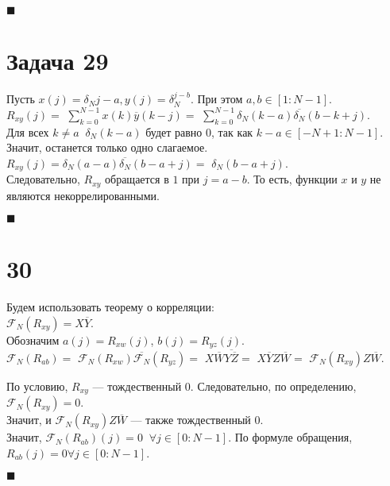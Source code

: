 \documentclass{article}
\newcommand\proofend{\begin{flushright}$\blacksquare$\end{flushright}}
\begin{document}
{\proofend
\pagebreak
\section*{Задача 29}

Пусть $x(j) = \delta_N{j - a}, y(j) = \delta_N^{j - b}$. При этом $a, b \in [1 : N - 1]$.\\

$R_{xy}(j) = $
$\sum\limits_{k = 0}^{N - 1} x(k) \overline{y} (k - j) =$
$\sum\limits_{k = 0}^{N - 1} \delta_N(k - a) \overline{\delta_N} (b - k + j).$\\

Для всех $k \neq a\;\;\delta_N(k - a)$ будет равно $0$, так как $k - a \in [-N+1:N-1]$. Значит, останется только одно слагаемое.\\

$R_{xy}(j) = \delta_N(a - a) \overline{\delta_N} (b - a + j) = $
$\delta_N (b - a + j).$\\
Следовательно, $R_{xy}$ обращается в $1$ при $j = a - b$. То есть, функции $x$ и $y$ не являются некоррелированными.

\proofend

\section*{30}
Будем использовать теорему о корреляции:\\
$\mathcal{F}_N(R_{xy}) = X\overline{Y}$. \\

Обозначим $a(j) = R_{xw}(j)$, $b(j) = R_{yz}(j)$.\\

$\mathcal{F}_N(R_{ab}) =$
$\mathcal{F}_N(R_{xw}) \overline{\mathcal{F}_N}(R_{yz}) =$
$X\overline{W} \overline{Y\overline{Z}} = $
$X\overline{Y} Z \overline{W} = $
$\mathcal{F}_N(R_{xy}) Z\overline{W}.$

По условию, $R_{xy}$ --- тождественный $0$. Следовательно, по определению, $\mathcal{F}_N(R_{xy}) = 0$.\\

Значит, и $\mathcal{F}_N(R_{xy}) Z \overline{W}$ --- также тождественный $0$.\\

Значит, $\mathcal{F}_N(R_{ab})(j) = 0 \;\;\forall j \in [0 : N - 1]$. По формуле обращения, $R_{ab}(j) = 0 \forall j \in [0 : N - 1]$.
\proofend
}
\end{document}
